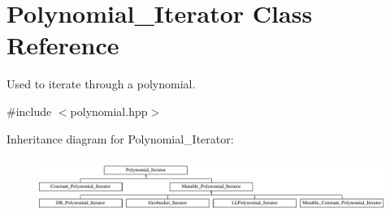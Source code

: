 \hypertarget{class_polynomial___iterator}{}\section{Polynomial\+\_\+\+Iterator Class Reference}
\label{class_polynomial___iterator}


Used to iterate through a polynomial.  




{\ttfamily \#include $<$polynomial.\+hpp$>$}

Inheritance diagram for Polynomial\+\_\+\+Iterator\+:\begin{figure}[H]
\begin{center}
\leavevmode
\includegraphics[height=1.779661cm]{class_polynomial___iterator}
\end{center}
\end{figure}
